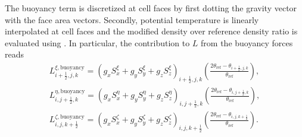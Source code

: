 The buoyancy term is discretized at cell faces by first dotting the gravity vector with the face area vectors. Secondly, potential temperature is linearly interpolated at cell faces and the modified density over reference density ratio is evaluated using . In particular, the contribution to $L$ from the buoyancy forces reads 
\begin{align}
	L^{\xi,\text{buoyancy}}_{i+\frac{1}{2},j,k} = \left(g_xS_x^\xi + g_yS_y^\xi + g_zS_z^\xi\right)_{i+\frac{1}{2},j,k}\left(\frac{2\theta_\text{ref} - \theta_{i+\frac{1}{2},j,k}}{\theta_\text{ref}}\right), \label{eq:buoyancyCsi} \\
	L^{\eta,\text{buoyancy}}_{i,j+\frac{1}{2},k} = \left(g_xS_x^\eta + g_yS_y^\eta + g_zS_z^\eta\right)_{i,j+\frac{1}{2},k}\left(\frac{2\theta_\text{ref} - \theta_{i,j+\frac{1}{2},k}}{\theta_\text{ref}}\right), \label{eq:buoyancyEta} \\
	L^{\zeta,\text{buoyancy}}_{i,j,k+\frac{1}{2}} = \left(g_xS_x^\zeta + g_yS_y^\zeta + g_zS_z^\zeta\right)_{i,j,k+\frac{1}{2}}\left(\frac{2\theta_\text{ref} - \theta_{i,j,k+\frac{1}{2}}}{\theta_\text{ref}}\right). \label{eq:buoyancyZet} 
\end{align}


